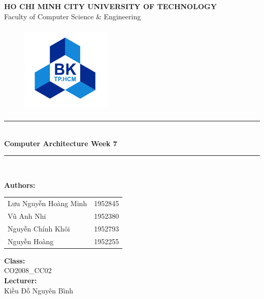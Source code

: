 \documentclass[12pt,a4paper]{article}
\newcommand\HRule{\rule{12cm}{1pt}}
\begin{document}
\begin{titlepage}

  \begin{center}

    \textbf{\fontsize{12pt}{1pt}\selectfont HO CHI MINH CITY UNIVERSITY OF TECHNOLOGY}\\[0.5cm]
    {\fontsize{13pt}{1pt}\selectfont Faculty of Computer Science \& Engineering}\\[0.5cm]
    \begin{figure}[H]
      \centering
      \includegraphics[width=1.7in,height=1.7in]{BK.png}
    \end{figure}

    \HRule\\[0.5cm]
    { \textbf{\fontsize{25pt}{1pt}\selectfont Computer Architecture Week 7}}\\[0.4cm]

    \HRule\\[0.8cm]
    \begin{minipage}{0.545\textwidth}
      \begin{flushleft}
        \textbf{Authors:}\\
        \begin{tabular}{l l}
          Lưu Nguyễn Hoàng Minh & 1952845 \\
          Vũ Anh Nhi            & 1952380 \\
          Nguyễn Chính Khôi     & 1952793 \\
          Nguyễn Hoàng          & 1952255 \\
        \end{tabular}
      \end{flushleft}
    \end{minipage}
    \begin{minipage}{0.4\textwidth}
      \begin{flushright}
        \textbf{Class:}\\
        CO2008\_CC02\\
        \textbf{Lecturer:}\\
        Kiều Đỗ Nguyên Bình\\


\end{flushright}
\end{minipage}
\end{center}
\end{titlepage}
\end{document}
